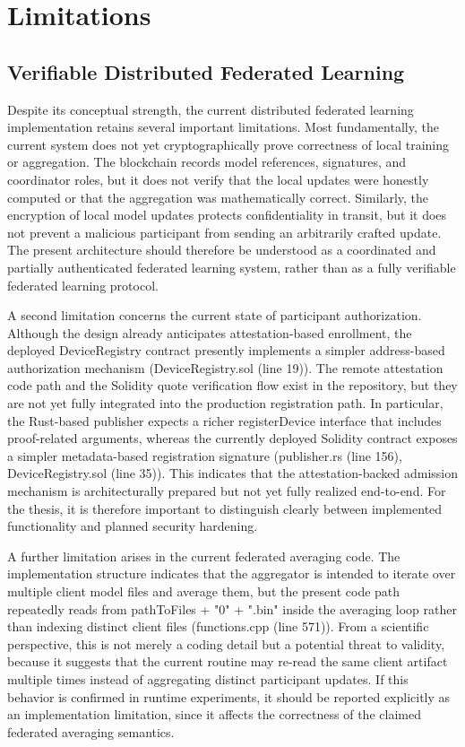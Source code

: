 \chapter{Limitations}
\label{cha:chapter5}

\section{Verifiable Distributed Federated Learning}

Despite its conceptual strength, the current distributed federated learning implementation retains several important limitations. Most fundamentally, the current system does not yet cryptographically prove correctness of local training or aggregation. The blockchain records model references, signatures, and coordinator roles, but it does not verify that the local updates were honestly computed or that the aggregation was mathematically correct. Similarly, the encryption of local model updates protects confidentiality in transit, but it does not prevent a malicious participant from sending an arbitrarily crafted update. The present architecture should therefore be understood as a coordinated and partially authenticated federated learning system, rather than as a fully verifiable federated learning protocol.

A second limitation concerns the current state of participant authorization. Although the design already anticipates attestation-based enrollment, the deployed DeviceRegistry contract presently implements a simpler address-based authorization mechanism (DeviceRegistry.sol (line 19)). The remote attestation code path and the Solidity quote verification flow exist in the repository, but they are not yet fully integrated into the production registration path. In particular, the Rust-based publisher expects a richer registerDevice interface that includes proof-related arguments, whereas the currently deployed Solidity contract exposes a simpler metadata-based registration signature (publisher.rs (line 156), DeviceRegistry.sol (line 35)). This indicates that the attestation-backed admission mechanism is architecturally prepared but not yet fully realized end-to-end. For the thesis, it is therefore important to distinguish clearly between implemented functionality and planned security hardening.

A further limitation arises in the current federated averaging code. The implementation structure indicates that the aggregator is intended to iterate over multiple client model files and average them, but the present code path repeatedly reads from pathToFiles + "0" + ".bin" inside the averaging loop rather than indexing distinct client files (functions.cpp (line 571)). From a scientific perspective, this is not merely a coding detail but a potential threat to validity, because it suggests that the current routine may re-read the same client artifact multiple times instead of aggregating distinct participant updates. If this behavior is confirmed in runtime experiments, it should be reported explicitly as an implementation limitation, since it affects the correctness of the claimed federated averaging semantics.

